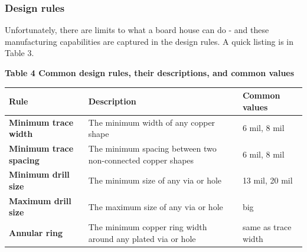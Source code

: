 \documentclass[letterpaper]{article}
\begin{document}
\subsubsection{Design rules}
\hypertarget{Toc337742683}{}{\sffamily\color[rgb]{0.30980393,0.5058824,0.7411765}
Unfortunately, there are limits to what a board house can do - and these manufacturing capabilities are captured in the
design rules. A quick listing is in Table 3.}


\bigskip

{\sffamily\bfseries\color[rgb]{0.30980393,0.5058824,0.7411765}
Table 4 Common design rules, their descriptions, and common values}

\begin{flushleft}
\tablefirsthead{}
\tablehead{}
\tabletail{}
\tablelasttail{}
\begin{supertabular}{|m{1.4247599in}|m{4.42126in}|m{1.4247599in}|}
\hline
{\sffamily\bfseries\color[rgb]{0.30980393,0.5058824,0.7411765} Rule} &
{\sffamily\bfseries\color[rgb]{0.30980393,0.5058824,0.7411765} Description} &
{\sffamily\bfseries\color[rgb]{0.30980393,0.5058824,0.7411765} Common values}\\\hline
{\sffamily\bfseries\color[rgb]{0.30980393,0.5058824,0.7411765} Minimum trace width} &
{\sffamily\color[rgb]{0.30980393,0.5058824,0.7411765} The minimum width of any copper shape} &
{\sffamily\color[rgb]{0.30980393,0.5058824,0.7411765} 6 mil, 8 mil}\\\hline
{\sffamily\bfseries\color[rgb]{0.30980393,0.5058824,0.7411765} Minimum trace spacing} &
{\sffamily\color[rgb]{0.30980393,0.5058824,0.7411765} The minimum spacing between two
non-connected copper shapes} &
{\sffamily\color[rgb]{0.30980393,0.5058824,0.7411765} 6 mil, 8 mil}\\\hline
{\sffamily\bfseries\color[rgb]{0.30980393,0.5058824,0.7411765} Minimum drill size} &
{\sffamily\color[rgb]{0.30980393,0.5058824,0.7411765} The minimum size of any via or hole} &
{\sffamily\color[rgb]{0.30980393,0.5058824,0.7411765} 13 mil, 20 mil}\\\hline
{\sffamily\bfseries\color[rgb]{0.30980393,0.5058824,0.7411765} Maximum drill size} &
{\sffamily\color[rgb]{0.30980393,0.5058824,0.7411765} The maximum size of any via or hole} &
{\sffamily\color[rgb]{0.30980393,0.5058824,0.7411765} big}\\\hline
{\sffamily\bfseries\color[rgb]{0.30980393,0.5058824,0.7411765} Annular ring} &
{\sffamily\color[rgb]{0.30980393,0.5058824,0.7411765} The minimum copper ring width around any
plated via or hole} &
{\sffamily\color[rgb]{0.30980393,0.5058824,0.7411765} same as trace width}\\\hline
\end{supertabular}
\end{flushleft}
\end{document}
